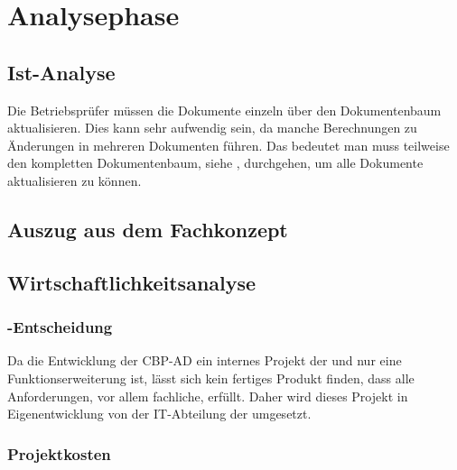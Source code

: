 
\clearpage
\section{Analysephase} 
\label{sec:Analysephase}


\subsection{Ist-Analyse} 
\label{sec:IstAnalyse}

Die Betriebsprüfer müssen die Dokumente einzeln über den Dokumentenbaum aktualisieren. Dies kann sehr aufwendig sein, da manche Berechnungen zu Änderungen in mehreren Dokumenten führen. Das bedeutet man muss teilweise den kompletten Dokumentenbaum, siehe , durchgehen, um alle Dokumente aktualisieren zu können.


\subsection{Auszug aus dem Fachkonzept}
\label{sec:AuszugFachkonzept}


\subsection{Wirtschaftlichkeitsanalyse}
\label{sec:Wirtschaftlichkeitsanalyse}

\subsubsection{-Entscheidung}
\label{sec:MakeOrBuyEntscheidung}

Da die Entwicklung der \acs{CBP-AD} ein internes Projekt der \DRV und nur eine Funktionserweiterung ist, lässt sich kein fertiges Produkt finden, dass alle Anforderungen, vor allem fachliche, erfüllt. Daher wird dieses Projekt in Eigenentwicklung von der IT-Abteilung der \DRV umgesetzt.

\subsubsection{Projektkosten}
\label{sec:Projektkosten}

